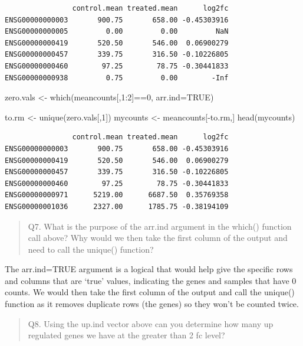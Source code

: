 \documentclass[
  letterpaper,
  DIV=11,
  numbers=noendperiod]{scrartcl}
\newenvironment{Shaded}{\begin{snugshade}}{\end{snugshade}}
\newcommand{\AttributeTok}[1]{\textcolor[rgb]{0.40,0.45,0.13}{#1}}
\newcommand{\ConstantTok}[1]{\textcolor[rgb]{0.56,0.35,0.01}{#1}}
\newcommand{\DecValTok}[1]{\textcolor[rgb]{0.68,0.00,0.00}{#1}}
\newcommand{\FunctionTok}[1]{\textcolor[rgb]{0.28,0.35,0.67}{#1}}
\newcommand{\NormalTok}[1]{\textcolor[rgb]{0.00,0.23,0.31}{#1}}
\newcommand{\OtherTok}[1]{\textcolor[rgb]{0.00,0.23,0.31}{#1}}
\newcommand{\SpecialCharTok}[1]{\textcolor[rgb]{0.37,0.37,0.37}{#1}}
\begin{document}
\begin{verbatim}
                control.mean treated.mean      log2fc
ENSG00000000003       900.75       658.00 -0.45303916
ENSG00000000005         0.00         0.00         NaN
ENSG00000000419       520.50       546.00  0.06900279
ENSG00000000457       339.75       316.50 -0.10226805
ENSG00000000460        97.25        78.75 -0.30441833
ENSG00000000938         0.75         0.00        -Inf
\end{verbatim}

\begin{Shaded}
\begin{Highlighting}[]
\NormalTok{zero.vals }\OtherTok{\textless{}{-}} \FunctionTok{which}\NormalTok{(meancounts[,}\DecValTok{1}\SpecialCharTok{:}\DecValTok{2}\NormalTok{]}\SpecialCharTok{==}\DecValTok{0}\NormalTok{, }\AttributeTok{arr.ind=}\ConstantTok{TRUE}\NormalTok{)}

\NormalTok{to.rm }\OtherTok{\textless{}{-}} \FunctionTok{unique}\NormalTok{(zero.vals[,}\DecValTok{1}\NormalTok{])}
\NormalTok{mycounts }\OtherTok{\textless{}{-}}\NormalTok{ meancounts[}\SpecialCharTok{{-}}\NormalTok{to.rm,]}
\FunctionTok{head}\NormalTok{(mycounts)}
\end{Highlighting}
\end{Shaded}

\begin{verbatim}
                control.mean treated.mean      log2fc
ENSG00000000003       900.75       658.00 -0.45303916
ENSG00000000419       520.50       546.00  0.06900279
ENSG00000000457       339.75       316.50 -0.10226805
ENSG00000000460        97.25        78.75 -0.30441833
ENSG00000000971      5219.00      6687.50  0.35769358
ENSG00000001036      2327.00      1785.75 -0.38194109
\end{verbatim}

\begin{quote}
Q7. What is the purpose of the arr.ind argument in the which() function
call above? Why would we then take the first column of the output and
need to call the unique() function?
\end{quote}

The arr.ind=TRUE argument is a logical that would help give the specific
rows and columns that are `true' values, indicating the genes and
samples that have 0 counts. We would then take the first column of the
output and call the unique() function as it removes duplicate rows (the
genes) so they won't be counted twice.

\begin{quote}
Q8. Using the up.ind vector above can you determine how many up
regulated genes we have at the greater than 2 fc level?
\end{quote}
\end{document}
